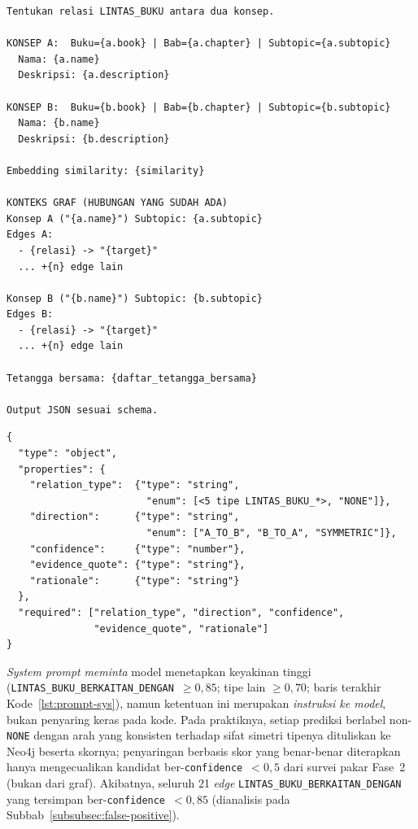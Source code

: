 \documentclass[../../thesis]{subfiles}
\begin{document}
\begin{lstlisting}[style=promptbox,caption={User prompt klasifikasi relasi (Pass-2). Blok \texttt{KONTEKS GRAF} memuat subtopik, hingga lima edge keluar tiap konsep, dan tetangga bersama.},label={lst:prompt-user}]
Tentukan relasi LINTAS_BUKU antara dua konsep.

KONSEP A:  Buku={a.book} | Bab={a.chapter} | Subtopic={a.subtopic}
  Nama: {a.name}
  Deskripsi: {a.description}

KONSEP B:  Buku={b.book} | Bab={b.chapter} | Subtopic={b.subtopic}
  Nama: {b.name}
  Deskripsi: {b.description}

Embedding similarity: {similarity}

KONTEKS GRAF (HUBUNGAN YANG SUDAH ADA)
Konsep A ("{a.name}") Subtopic: {a.subtopic}
Edges A:
  - {relasi} -> "{target}"
  ... +{n} edge lain

Konsep B ("{b.name}") Subtopic: {b.subtopic}
Edges B:
  - {relasi} -> "{target}"
  ... +{n} edge lain

Tetangga bersama: {daftar_tetangga_bersama}

Output JSON sesuai schema.
\end{lstlisting}

\begin{lstlisting}[style=promptbox,caption={Skema respons JSON yang dipaksakan pada keluaran model (Pass-2).},label={lst:prompt-schema}]
{
  "type": "object",
  "properties": {
    "relation_type":  {"type": "string",
                        "enum": [<5 tipe LINTAS_BUKU_*>, "NONE"]},
    "direction":      {"type": "string",
                        "enum": ["A_TO_B", "B_TO_A", "SYMMETRIC"]},
    "confidence":     {"type": "number"},
    "evidence_quote": {"type": "string"},
    "rationale":      {"type": "string"}
  },
  "required": ["relation_type", "direction", "confidence",
               "evidence_quote", "rationale"]
}
\end{lstlisting}

\noindent \textit{System prompt} \emph{meminta} model menetapkan keyakinan
tinggi (\texttt{LINTAS\_BUKU\_BERKAITAN\_DENGAN}~$\geq 0{,}85$; tipe lain
$\geq 0{,}70$; baris terakhir Kode~\ref{lst:prompt-sys}), namun ketentuan ini
merupakan \emph{instruksi ke model}, bukan penyaring keras pada kode. Pada
praktiknya, setiap prediksi berlabel non-\texttt{NONE} dengan arah yang
konsisten terhadap sifat simetri tipenya dituliskan ke Neo4j beserta skornya;
penyaringan berbasis skor yang benar-benar diterapkan hanya mengecualikan
kandidat ber-\texttt{confidence}~$< 0{,}5$ dari survei pakar Fase~2 (bukan dari
graf). Akibatnya, seluruh 21 \textit{edge}
\texttt{LINTAS\_BUKU\_BERKAITAN\_DENGAN} yang tersimpan
ber-\texttt{confidence}~$< 0{,}85$ (dianalisis pada
Subbab~\ref{subsubsec:false-positive}).
\end{document}
